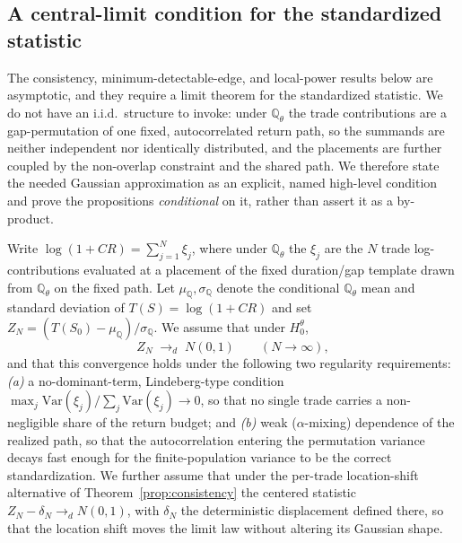\documentclass[risks,article,submit,pdftex,oneauthor]{Definitions/mdpi}
\begin{document}
\subsection{A central-limit condition for the standardized statistic}
\label{sec:clt-assumption}

The consistency, minimum-detectable-edge, and local-power results below are
asymptotic, and they require a limit theorem for the standardized statistic. We
do not have an i.i.d.\ structure to invoke: under $\mathbb{Q}_\theta$ the trade
contributions are a gap-permutation of one fixed, autocorrelated return path, so
the summands are neither independent nor identically distributed, and the
placements are further coupled by the non-overlap constraint and the shared path.
We therefore state the needed Gaussian approximation as an explicit, named
high-level condition and prove the propositions \emph{conditional} on it, rather
than assert it as a by-product.

\begin{Assumption}
\label{ass:clt}
Write $\log(1+CR)=\sum_{j=1}^{N}\xi_j$, where under $\mathbb{Q}_\theta$ the $\xi_j$
are the $N$ trade log-contributions evaluated at a placement of the fixed
duration/gap template drawn from $\mathbb{Q}_\theta$ on the fixed path. Let
$\mu_{\mathbb Q},\sigma_{\mathbb Q}$ denote the conditional $\mathbb{Q}_\theta$
mean and standard deviation of $T(S)=\log(1+CR)$ and set
$Z_N=(T(S_0)-\mu_{\mathbb Q})/\sigma_{\mathbb Q}$. We assume that under
$H_0^\theta$,
\[
Z_N \;\to_d\; N(0,1) \qquad (N\to\infty),
\]
and that this convergence holds under the following two regularity requirements:
\emph{(a)} a no-dominant-term, Lindeberg-type condition
$\max_{j}\mathrm{Var}(\xi_j)/\allowbreak\sum_{j}\mathrm{Var}(\xi_j)\to0$, so that no
single trade carries a non-negligible share of the return budget; and
\emph{(b)} weak ($\alpha$-mixing) dependence of the realized path, so that the
autocorrelation entering the permutation variance decays fast enough for the
finite-population variance to be the correct standardization. We further assume
that under the per-trade location-shift alternative of
Theorem~\ref{prop:consistency} the centered statistic $Z_N-\delta_N\to_d N(0,1)$,
with $\delta_N$ the deterministic displacement defined there, so that the
location shift moves the limit law without altering its Gaussian shape.
\end{Assumption}
\end{document}
